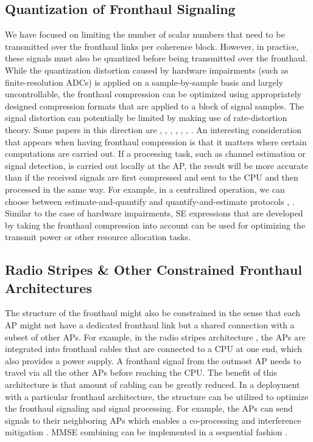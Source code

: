 \subsection{Quantization of Fronthaul Signaling}
We have focused on limiting the number of scalar numbers that need to be transmitted over the fronthaul links per coherence block. However, in practice, these signals must also be quantized before being transmitted over the fronthaul. While the quantization distortion caused by hardware impairments (such as finite-resolution ADCs) is applied on a sample-by-sample basis and largely uncontrollable, the fronthaul compression can be optimized using appropriately designed compression formats that are applied to a block of signal samples. The signal distortion can potentially be limited by making use of rate-distortion theory. Some papers in this direction are \cite{Bashar2020c}, \cite{Bashar2019b}, \cite{Boroujerdi2019a}, \cite{Femenias2019a}, \cite{Maryopi2019a}, \cite{Masoumi2020a}, \cite{Parida2018a}. An interesting consideration that appears when having fronthaul compression is that it matters where certain computations are carried out. If a processing task, such as channel estimation or signal detection, is carried out locally at the AP, the result will be more accurate than if the received signals are first compressed and sent to the CPU and then processed in the same way. 
For example, in a centralized operation, we can choose between estimate-and-quantify and quantify-and-estimate protocols \cite{Bashar2019b}, \cite{Maryopi2019a}. Similar to the case of hardware impairments, SE expressions that are developed by taking the fronthaul compression into account can be used for optimizing the transmit power or other resource allocation tasks.


\enlargethispage{\baselineskip} 

\subsection{Radio Stripes \& Other Constrained Fronthaul Architectures}

The structure of the fronthaul might also be constrained in the sense that each AP might not have a dedicated fronthaul link but a shared connection with a subset of other APs. For example, in the radio stripes architecture \cite{Interdonato2018}, the APs are integrated into fronthaul cables that are connected to a CPU at one end, which also provides a power supply. A fronthaul signal from the outmost AP needs to travel via all the other APs before reaching the CPU. The benefit of this architecture is that amount of cabling can be greatly reduced. In a deployment with a particular fronthaul architecture, the structure can be utilized to optimize the fronthaul signaling and signal processing. For example, the APs can send signals to their neighboring APs which enables a co-processing and interference mitigation \cite{Shaik2020a}. MMSE combining can be implemented in a sequential fashion \cite{Shaik2021a}.


